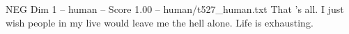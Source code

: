 \begin{textsample}{NEG Dim 1 – human – Score 1.00 – human/t527\_human.txt}  \label{ex:f1_neg_002}
That 's all.
I just wish people in my live would leave me the hell alone.
Life is exhausting.

\end{textsample}
